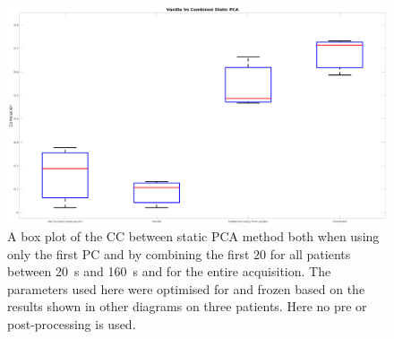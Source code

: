             \begin{figure}
                \centering
                
                \includegraphics[width=1.0\linewidth]{figures/data_driven_surrogate_signal_extraction_results_1_box_plot.png}
                
                \captionsetup{singlelinecheck=false, justification=centering}
                \caption{A box plot of the \gls{CC} between static \gls{PCA} method both when using only the first \gls{PC} and by combining the first $20$  for all patients between \SI{20}{\second} and \SI{160}{\second} and for the entire acquisition. The parameters used here were optimised for and frozen based on the results shown in other diagrams on three patients. Here no pre or post-processing is used.}
                \label{fig:pca_data_driven_surrogate_signal_extraction_methods_for_dynamic_pet_results_box_plot}
            \end{figure}
            
